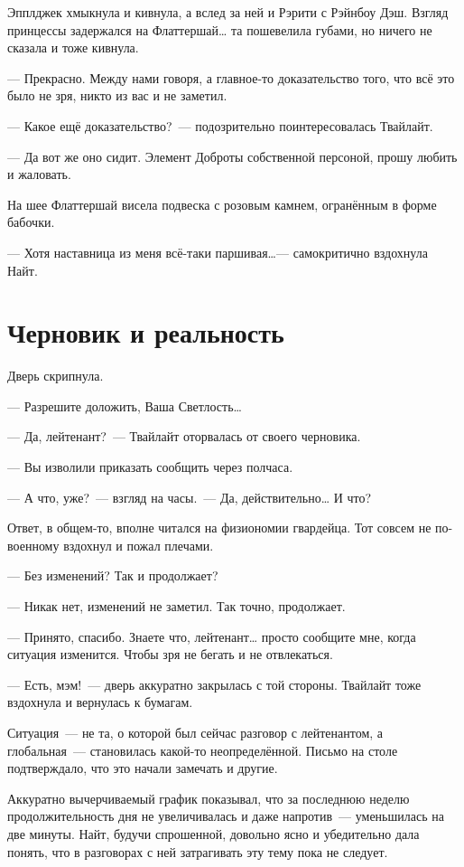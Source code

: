 \documentclass[twoside,a5paper,12pt]{extbook}
\begin{document}
Эпплджек хмыкнула и кивнула, а вслед за ней и Рэрити с Рэйнбоу Дэш. Взгляд принцессы задержался на Флаттершай… та пошевелила губами, но ничего не сказала и тоже кивнула.

— Прекрасно. Между нами говоря, а главное-то доказательство того, что всё это было не зря, никто из вас и не заметил.

— Какое ещё доказательство? — подозрительно поинтересовалась Твайлайт.

— Да вот же оно сидит. Элемент Доброты собственной персоной, прошу любить и жаловать.

На шее Флаттершай висела подвеска с розовым камнем, огранённым в форме бабочки.

— Хотя наставница из меня всё-таки паршивая…— самокритично вздохнула Найт.


\chapter{Черновик и реальность}

Дверь скрипнула.

— Разрешите доложить, Ваша Светлость…

— Да, лейтенант? — Твайлайт оторвалась от своего черновика.

— Вы изволили приказать сообщить через полчаса.

— А что, уже? — взгляд на часы. — Да, действительно… И что?

Ответ, в общем-то, вполне читался на физиономии гвардейца. Тот совсем не по-военному вздохнул и пожал плечами.

— Без изменений? Так и продолжает?

— Никак нет, изменений не заметил. Так точно, продолжает.

— Принято, спасибо. Знаете что, лейтенант… просто сообщите мне, когда ситуация изменится. Чтобы зря не бегать и не отвлекаться.

— Есть, мэм! — дверь аккуратно закрылась с той стороны. Твайлайт тоже вздохнула и вернулась к бумагам.

Ситуация — не та, о которой был сейчас разговор с лейтенантом, а глобальная — становилась какой-то неопределённой. Письмо на столе подтверждало, что это начали замечать и другие.

Аккуратно вычерчиваемый график показывал, что за последнюю неделю продолжительность дня не увеличивалась и даже напротив — уменьшилась на две минуты. Найт, будучи спрошенной, довольно ясно и убедительно дала понять, что в разговорах с ней затрагивать эту тему пока не следует.
\end{document}
